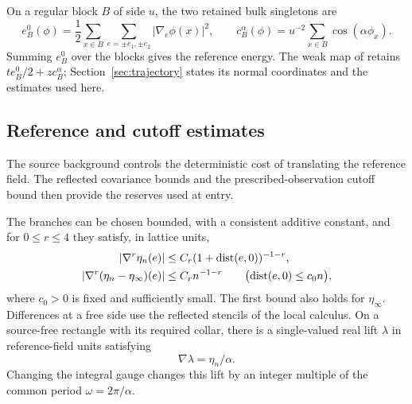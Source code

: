 On a regular block \(B\) of side \(u\), the two retained bulk
singletons are
\begin{equation}\label{eq:singletons}
 e_B^0(\phi)=\frac12\sum_{x\in B}\sum_{e=\pm e_1,\pm e_2}
                  |\nabla_e\phi(x)|^2,\qquad
 c_B^\alpha(\phi)=u^{-2}\sum_{x\in B}\cos(\alpha\phi_x).
\end{equation}
Summing \(e_B^0\) over the blocks gives the reference energy.
The weak map of \cite[Proposition~8.3]{B} retains
\(t e_B^0/2+z c_B^\alpha\); Section~\ref{sec:trajectory} states its
normal coordinates and the estimates used here.

\subsection{Reference and cutoff estimates}

The source background controls the deterministic cost of translating
the reference field.  The reflected covariance bounds and the
prescribed-observation cutoff bound then provide the reserves used at
entry.

\begin{lemma}\label{ent:center-background}
The branches can be chosen bounded, with a consistent additive
constant, and for \(0\le r\le4\) they satisfy, in lattice units,
\begin{equation}\label{ent:unit-decay}
\begin{split}
 |\nabla^r\eta_n(e)|
   &\le C_r(1+\operatorname{dist}(e,0))^{-1-r},\\
 |\nabla^r(\eta_n-\eta_\infty)(e)|
   &\le C_r n^{-1-r}
       \qquad\bigl(\operatorname{dist}(e,0)\le c_0n\bigr),
\end{split}
\end{equation}
where \(c_0>0\) is fixed and sufficiently small.  The first bound also
holds for \(\eta_\infty\).  Differences at a free side use the
reflected stencils of the local calculus.  On a source-free rectangle
with its required collar, there is a single-valued real lift
\(\lambda\) in reference-field units satisfying
\[
                         \nabla\lambda=\eta_n/\alpha .
\]
Changing the integral gauge changes this lift by an integer multiple
of the common period \(\omega=2\pi/\alpha\).
\end{lemma}

